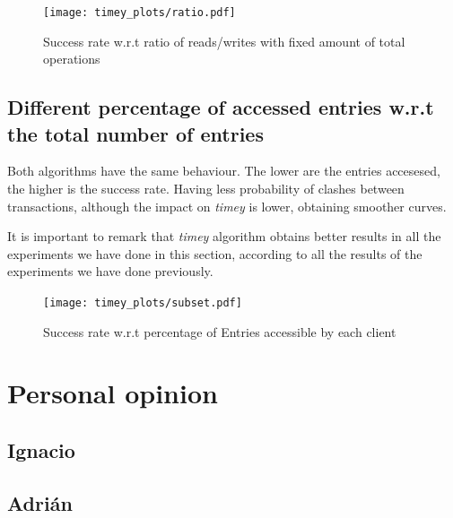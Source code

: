 \documentclass[a4paper, 10pt]{article}
\begin{document}
\begin{figure}[H]
  \centering
  \texttt{[image: timey\_plots/ratio.pdf]}
    \caption{Success rate w.r.t ratio of reads/writes with fixed amount of total operations}
    \label{timey:ratio}
\end{figure} 

\clearpage
\subsection{Different percentage of accessed entries w.r.t the total number of entries}

Both algorithms have the same behaviour. The lower are the entries accesesed, the higher is the success rate. Having less probability of clashes between transactions, although the impact on \textit{timey} is lower, obtaining smoother curves.

It is important to remark that \textit{timey} algorithm obtains better results in all the experiments we have done in this section, according to all the results of the experiments we have done previously.

\begin{figure}[H]
  \centering
  \texttt{[image: timey\_plots/subset.pdf]}
    \caption{Success rate w.r.t percentage of Entries accessible by each client}
    \label{timey:subset}
\end{figure} 

\clearpage
\section{Personal opinion}

\subsection{Ignacio}

\subsection{Adrián}
\end{document}
